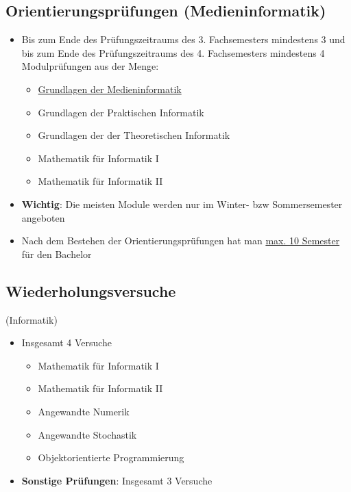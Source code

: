 \documentclass[
	aspectratio=169, 
	8pt 
]{beamer}
\begin{document}
\subsection{Orientierungsprüfungen (Medieninformatik)}
\begin{frame}{\insertsubsection \footnotemark[1]}
    \begin{itemize}
        \item Bis zum Ende des Prüfungszeitraums des 3. Fachsemesters mindestens 3 und bis zum Ende des Prüfungszeitraums des 4. Fachsemesters mindestens 4 Modulprüfungen aus der Menge: \begin{itemize}
        \item \underline{Grundlagen der Medieninformatik}
        \item Grundlagen der Praktischen Informatik
        \item Grundlagen der der Theoretischen Informatik
        \item Mathematik für Informatik I
        \item Mathematik für Informatik II \end{itemize}
        \item \textbf{Wichtig}: Die meisten Module werden nur im Winter- bzw Sommersemester angeboten
        \item Nach dem Bestehen der Orientierungsprüfungen hat man \underline{max. 10 Semester} für den Bachelor
    \end{itemize}

\end{frame}


\subsection{Wiederholungsversuche}
\begin{frame}{\insertsubsection \space (Informatik)}
    \begin{itemize}
        \item Insgesamt 4 Versuche \footnotemark[1] \begin{itemize} 
            \item Mathematik für Informatik I
            \item Mathematik für Informatik II
            \item Angewandte Numerik
            \item Angewandte Stochastik
            \item Objektorientierte Programmierung \end{itemize}
        \item \textbf{Sonstige Prüfungen}: Insgesamt 3 Versuche
    \end{itemize}

\end{frame}
\end{document}
